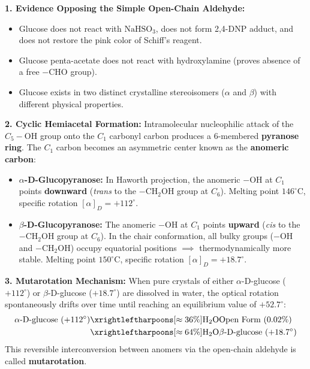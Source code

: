 \documentclass[10pt,twoside,openright]{book}
\begin{document}
\begin{conceptbox}
\textbf{1. Evidence Opposing the Simple Open-Chain Aldehyde:}
\begin{itemize}
  \item Glucose does not react with $\mathrm{NaHSO_3}$, does not form 2,4-DNP adduct, and does not restore the pink color of Schiff's reagent.
  \item Glucose penta-acetate does not react with hydroxylamine (proves absence of a free $-\mathrm{CHO}$ group).
  \item Glucose exists in two distinct crystalline stereoisomers ($\alpha$ and $\beta$) with different physical properties.
\end{itemize}
\textbf{2. Cyclic Hemiacetal Formation:}
Intramolecular nucleophilic attack of the $C_5-\mathrm{OH}$ group onto the $C_1$ carbonyl carbon produces a 6-membered \textbf{pyranose ring}. The $C_1$ carbon becomes an asymmetric center known as the \textbf{anomeric carbon}:
\begin{itemize}
  \item \textbf{$\alpha$-D-Glucopyranose:} In Haworth projection, the anomeric $-\mathrm{OH}$ at $C_1$ points \textbf{downward} (\textit{trans} to the $-\mathrm{CH_2OH}$ group at $C_6$). Melting point $146^\circ\text{C}$, specific rotation $[\alpha]_D = +112^\circ$.
  \item \textbf{$\beta$-D-Glucopyranose:} The anomeric $-\mathrm{OH}$ at $C_1$ points \textbf{upward} (\textit{cis} to the $-\mathrm{CH_2OH}$ group at $C_6$). In the chair conformation, all bulky groups ($-\mathrm{OH}$ and $-\mathrm{CH_2OH}$) occupy equatorial positions $\implies$ thermodynamically more stable. Melting point $150^\circ\text{C}$, specific rotation $[\alpha]_D = +18.7^\circ$.
\end{itemize}
\textbf{3. Mutarotation Mechanism:}
When pure crystals of either $\alpha$-D-glucose ($+112^\circ$) or $\beta$-D-glucose ($+18.7^\circ$) are dissolved in water, the optical rotation spontaneously drifts over time until reaching an equilibrium value of \textbf{$+52.7^\circ$}:
\begin{align}
  \alpha\text{-D-glucose } (+112^\circ) &\xrightleftharpoons[\approx 36\%]{\mathrm{H_2O}} \text{Open Form } (0.02\%) \\
  &\xrightleftharpoons[\approx 64\%]{\mathrm{H_2O}} \beta\text{-D-glucose } (+18.7^\circ)
\end{align}
This reversible interconversion between anomers via the open-chain aldehyde is called \textbf{mutarotation}.
\end{conceptbox}
\end{document}
